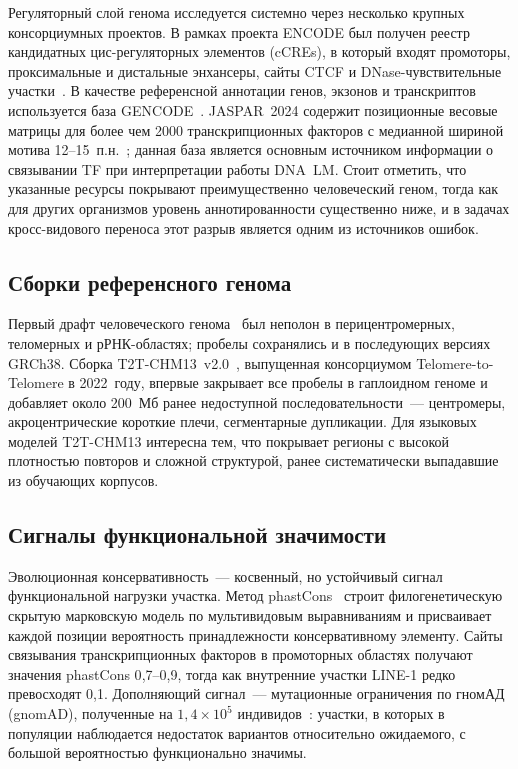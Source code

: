Регуляторный слой генома исследуется системно через несколько крупных
консорциумных проектов. В рамках проекта ENCODE был получен реестр
кандидатных цис-регуляторных элементов (cCREs), в который входят
промоторы, проксимальные и дистальные энхансеры, сайты CTCF и
DNase-чувствительные участки~\cite{encodeExpandedRegistry2024}. В
качестве референсной аннотации генов, экзонов и транскриптов
используется база GENCODE~\cite{frankishGENCODE2019}. JASPAR~2024
содержит позиционные весовые матрицы для более чем 2000
транскрипционных факторов с медианной шириной мотива
12--15~п.н.~\cite{rauluseviciuteJASPAR2024}; данная база
является основным источником информации о связывании TF при
интерпретации работы DNA~LM. Стоит отметить, что указанные ресурсы
покрывают преимущественно человеческий геном, тогда как для других
организмов уровень аннотированности существенно ниже, и в задачах
кросс-видового переноса этот разрыв является одним из источников
ошибок.

\subsection{Сборки референсного генома}

Первый драфт человеческого генома~\cite{landerInitialSequencingAnalysis2001}
был неполон в перицентромерных, теломерных и рРНК-областях; пробелы
сохранялись и в последующих версиях GRCh38. Сборка
T2T-CHM13~v2.0~\cite{nurgalievT2TCHm13CompleteHuman2022}, выпущенная
консорциумом Telomere-to-Telomere в 2022~году, впервые закрывает все
пробелы в гаплоидном геноме и добавляет около 200~Мб ранее недоступной
последовательности~--- центромеры, акроцентрические короткие плечи,
сегментарные дупликации. Для языковых моделей T2T-CHM13 интересна
тем, что покрывает регионы с высокой плотностью повторов и сложной
структурой, ранее систематически выпадавшие из обучающих корпусов.

\subsection{Сигналы функциональной значимости}

Эволюционная консервативность~--- косвенный, но устойчивый сигнал
функциональной нагрузки участка. Метод
phastCons~\cite{siepelEvolutionarilyConservedElements2005} строит
филогенетическую скрытую марковскую модель по мультивидовым
выравниваниям и присваивает каждой позиции вероятность принадлежности
консервативному элементу. Сайты связывания транскрипционных факторов
в промоторных областях получают значения phastCons 0{,}7--0{,}9,
тогда как внутренние участки LINE-1 редко превосходят 0{,}1.
Дополняющий сигнал~--- мутационные ограничения по гномАД (gnomAD),
полученные на $1{,}4 \times 10^5$
индивидов~\cite{karczewskiMutationalConstraintSpectrum2020}: участки,
в которых в популяции наблюдается недостаток вариантов относительно
ожидаемого, с большой вероятностью функционально значимы.

